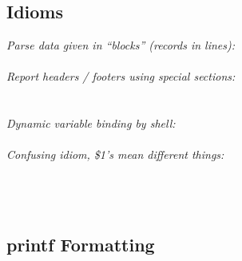 \subsection*{Idioms}
\textit{Parse data given in ``blocks'' (records in lines):}\\
\\[1mm]
\textit{Report headers / footers using special sections:}\\
\\
\\[1mm]
\textit{Dynamic variable binding by shell:}\\
\\[1mm]
\textit{Confusing idiom, \$1's mean different things:}\\
\\
\\
\\[20mm] %

\subsection*{printf Formatting}


